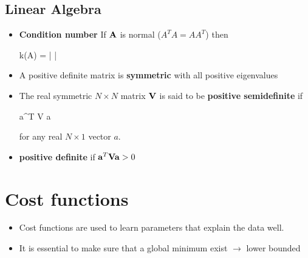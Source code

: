 
\subsection{Linear Algebra}
\begin{itemize}




\item \textbf{Condition number} 
If $\mathbf{A}$ is normal ($A^T A = A A^T$) then
\begin{myalign*}
    k(\*A) = 
    \left|
    \right|
\end{myalign*}

\item A positive definite matrix is \textbf{symmetric} with all positive eigenvalues
\item The real symmetric $N \times N$ matrix $\mathbf{V}$ is said to be \textbf{positive semidefinite} if 
\begin{myalign*}
    \*a^T \*V \*a 
\end{myalign*}
for any real $N \times 1$ vector $a$.
\item \textbf{positive definite} if $\mathbf{a}^T \mathbf{V} \mathbf{a} > 0$

\end{itemize}

\section{Cost functions}
\begin{itemize}
    \item Cost functions are used to learn parameters that explain the data well.
    \item It is essential to make sure that a global minimum exist $\rightarrow$ lower bounded
\end{itemize}

